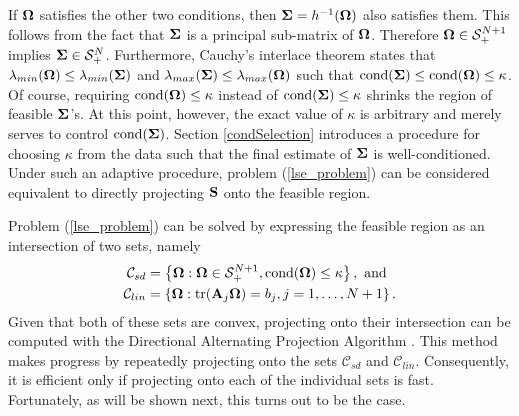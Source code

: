 \documentclass[11pt]{article}
\newcommand{\R}{\mathbb{R}}
\theoremstyle{definition}
\theoremstyle{definition}
\def\bSigma{{\bf \Sigma}}
\def\bOmega{{\bf \Omega}}
\def\A{{\bf A}}
\def\SS{{\bf S}}
\def\cond{\text{cond}}
\def\Tr{\text{tr}}
\begin{document}
If $\bOmega$ satisfies the other two conditions,  then $\bSigma = h^{-1}(\bOmega)$ also satisfies them. This follows from the fact that $\bSigma$ is a principal sub-matrix of $\bOmega$. Therefore $\bOmega \in \mathcal{S}_{+}^{N+1}$ implies $\bSigma \in \mathcal{S}_{+}^{N}$. Furthermore, Cauchy's interlace theorem states that $\lambda_{min}(\bOmega) \leq \lambda_{min}(\bSigma)$ and $\lambda_{max}(\bSigma) \leq \lambda_{max}(\bOmega)$ such that $\cond(\bSigma) \leq \cond(\bOmega) \leq \kappa$. Of course, requiring $\cond(\bOmega) \leq \kappa$ instead of $\cond(\bSigma) \leq \kappa$ shrinks the region of feasible $\bSigma$'s. 
 At this point, however, the exact value of $\kappa$ is arbitrary and merely serves to control $\cond(\bSigma)$.  
 Section \ref{condSelection} introduces a procedure for choosing $\kappa$ from the data such that the final estimate of $\bSigma$ is well-conditioned. Under such an adaptive procedure, problem (\ref{lse_problem}) can be considered equivalent to directly projecting $\SS$ onto the feasible region. 



Problem (\ref{lse_problem}) can be solved by expressing  the feasible region as an intersection of two sets, namely 
\begin{align*}
\mathcal{C}_{sd} &= \left\{\bOmega : \bOmega \in \mathcal{S}_{+}^{N+1}, \cond(\bOmega) \leq \kappa\right\}, \text{ and }\\
\mathcal{C}_{lin} &= \left\{\bOmega : \Tr(\A_j \bOmega) = b_j, j = 1, \dots, N+1\right\}.
\end{align*}
Given that both of these sets are convex, projecting onto their intersection can be computed with the Directional Alternating Projection Algorithm \citep{gubin1967method}. This method makes progress by repeatedly projecting onto the sets $\mathcal{C}_{sd}$ and $\mathcal{C}_{lin}$. Consequently, it is efficient only if projecting onto each of the individual sets is fast. Fortunately, as will be shown next, this turns out to be the case. 


%
%
\end{document}
